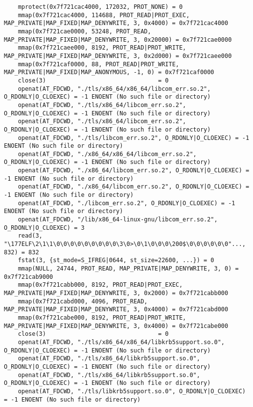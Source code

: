 \documentclass[pdf, unicode, 12pt, a4paper,oneside,fleqn]{article}
\begin{document}
{\begin{verbatim}
    mprotect(0x7f721cac4000, 172032, PROT_NONE) = 0
    mmap(0x7f721cac4000, 114688, PROT_READ|PROT_EXEC, MAP_PRIVATE|MAP_FIXED|MAP_DENYWRITE, 3, 0x4000) = 0x7f721cac4000
    mmap(0x7f721cae0000, 53248, PROT_READ, MAP_PRIVATE|MAP_FIXED|MAP_DENYWRITE, 3, 0x20000) = 0x7f721cae0000
    mmap(0x7f721caee000, 8192, PROT_READ|PROT_WRITE, MAP_PRIVATE|MAP_FIXED|MAP_DENYWRITE, 3, 0x2d000) = 0x7f721caee000
    mmap(0x7f721caf0000, 88, PROT_READ|PROT_WRITE, MAP_PRIVATE|MAP_FIXED|MAP_ANONYMOUS, -1, 0) = 0x7f721caf0000
    close(3)                                = 0
    openat(AT_FDCWD, "./tls/x86_64/x86_64/libcom_err.so.2", O_RDONLY|O_CLOEXEC) = -1 ENOENT (No such file or directory)
    openat(AT_FDCWD, "./tls/x86_64/libcom_err.so.2", O_RDONLY|O_CLOEXEC) = -1 ENOENT (No such file or directory)
    openat(AT_FDCWD, "./tls/x86_64/libcom_err.so.2", O_RDONLY|O_CLOEXEC) = -1 ENOENT (No such file or directory)
    openat(AT_FDCWD, "./tls/libcom_err.so.2", O_RDONLY|O_CLOEXEC) = -1 ENOENT (No such file or directory)
    openat(AT_FDCWD, "./x86_64/x86_64/libcom_err.so.2", O_RDONLY|O_CLOEXEC) = -1 ENOENT (No such file or directory)
    openat(AT_FDCWD, "./x86_64/libcom_err.so.2", O_RDONLY|O_CLOEXEC) = -1 ENOENT (No such file or directory)
    openat(AT_FDCWD, "./x86_64/libcom_err.so.2", O_RDONLY|O_CLOEXEC) = -1 ENOENT (No such file or directory)
    openat(AT_FDCWD, "./libcom_err.so.2", O_RDONLY|O_CLOEXEC) = -1 ENOENT (No such file or directory)
    openat(AT_FDCWD, "/lib/x86_64-linux-gnu/libcom_err.so.2", O_RDONLY|O_CLOEXEC) = 3
    read(3, "\177ELF\2\1\1\0\0\0\0\0\0\0\0\0\3\0>\0\1\0\0\0\200$\0\0\0\0\0\0"..., 832) = 832
    fstat(3, {st_mode=S_IFREG|0644, st_size=22600, ...}) = 0
    mmap(NULL, 24744, PROT_READ, MAP_PRIVATE|MAP_DENYWRITE, 3, 0) = 0x7f721cab9000
    mmap(0x7f721cabb000, 8192, PROT_READ|PROT_EXEC, MAP_PRIVATE|MAP_FIXED|MAP_DENYWRITE, 3, 0x2000) = 0x7f721cabb000
    mmap(0x7f721cabd000, 4096, PROT_READ, MAP_PRIVATE|MAP_FIXED|MAP_DENYWRITE, 3, 0x4000) = 0x7f721cabd000
    mmap(0x7f721cabe000, 8192, PROT_READ|PROT_WRITE, MAP_PRIVATE|MAP_FIXED|MAP_DENYWRITE, 3, 0x4000) = 0x7f721cabe000
    close(3)                                = 0
    openat(AT_FDCWD, "./tls/x86_64/x86_64/libkrb5support.so.0", O_RDONLY|O_CLOEXEC) = -1 ENOENT (No such file or directory)
    openat(AT_FDCWD, "./tls/x86_64/libkrb5support.so.0", O_RDONLY|O_CLOEXEC) = -1 ENOENT (No such file or directory)
    openat(AT_FDCWD, "./tls/x86_64/libkrb5support.so.0", O_RDONLY|O_CLOEXEC) = -1 ENOENT (No such file or directory)
    openat(AT_FDCWD, "./tls/libkrb5support.so.0", O_RDONLY|O_CLOEXEC) = -1 ENOENT (No such file or directory)

\end{verbatim}}
\end{document}
